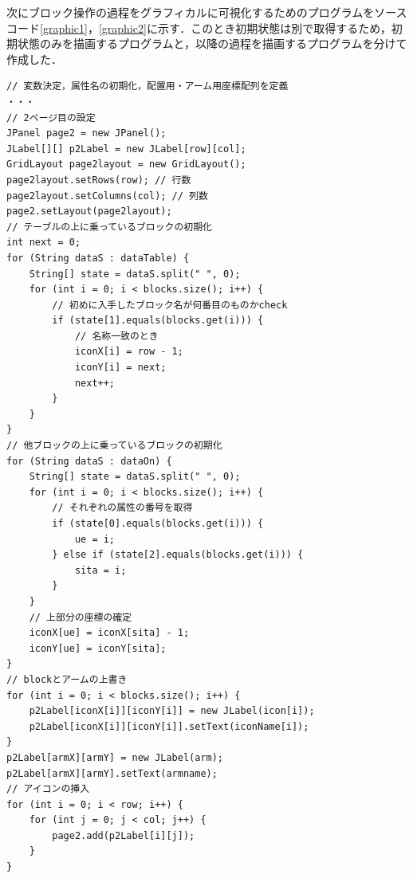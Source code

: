 \documentclass[uplatex,12pt]{jsarticle}
\begin{document}
次にブロック操作の過程をグラフィカルに可視化するためのプログラムをソースコード\ref{graphic1}，\ref{graphic2}に示す．このとき初期状態は別で取得するため，初期状態のみを描画するプログラムと，以降の過程を描画するプログラムを分けて作成した．
\begin{lstlisting}[caption=グラフィカル表示1(一部抜粋),label=graphic1]
// 変数決定，属性名の初期化，配置用・アーム用座標配列を定義
・・・
// 2ページ目の設定
JPanel page2 = new JPanel();
JLabel[][] p2Label = new JLabel[row][col];
GridLayout page2layout = new GridLayout();
page2layout.setRows(row); // 行数
page2layout.setColumns(col); // 列数
page2.setLayout(page2layout);
// テーブルの上に乗っているブロックの初期化
int next = 0;
for (String dataS : dataTable) {
	String[] state = dataS.split(" ", 0);
	for (int i = 0; i < blocks.size(); i++) {
		// 初めに入手したブロック名が何番目のものかcheck
		if (state[1].equals(blocks.get(i))) {
			// 名称一致のとき
			iconX[i] = row - 1;
			iconY[i] = next;
			next++;
		}
	}
}
// 他ブロックの上に乗っているブロックの初期化
for (String dataS : dataOn) {
	String[] state = dataS.split(" ", 0);
	for (int i = 0; i < blocks.size(); i++) {
		// それぞれの属性の番号を取得
		if (state[0].equals(blocks.get(i))) {
			ue = i;
		} else if (state[2].equals(blocks.get(i))) {
			sita = i;
		}
	}
	// 上部分の座標の確定
	iconX[ue] = iconX[sita] - 1;
	iconY[ue] = iconY[sita];
}
// blockとアームの上書き
for (int i = 0; i < blocks.size(); i++) {
	p2Label[iconX[i]][iconY[i]] = new JLabel(icon[i]);
	p2Label[iconX[i]][iconY[i]].setText(iconName[i]);
}
p2Label[armX][armY] = new JLabel(arm);
p2Label[armX][armY].setText(armname);
// アイコンの挿入
for (int i = 0; i < row; i++) {
	for (int j = 0; j < col; j++) {
		page2.add(p2Label[i][j]);
	}
}
\end{lstlisting}
\end{document}
